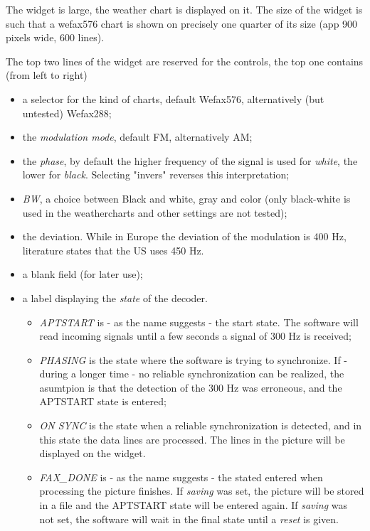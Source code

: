 \documentclass[11pt]{article}
\begin{document}
The widget is large, the weather chart is displayed
on it. The size of the widget is such that a wefax576 chart is shown
on precisely one quarter of its size (app 900 pixels wide, 600 lines).
\par
The top two lines of the widget are reserved for the controls,
the top one contains (from left to right)
\begin{itemize}
\item a selector for the kind of charts, default Wefax576, alternatively
(but untested) Wefax288;
\item the {\em modulation mode}, default FM, alternatively AM;
\item the {\em phase}, by default the higher frequency of the signal
is used for {\em white}, the lower for {\em black}.
Selecting "invers" reverses this interpretation;
\item {\em BW}, a choice between Black and white, gray and color
(only black-white is used in the weathercharts and other settings are not
tested);
\item the {deviation}. While in Europe the deviation of the modulation is
400 Hz, literature states that the US uses 450 Hz.
\item a blank field (for later use);
\item a label displaying the {\em state} of the decoder. 
\begin{itemize}
\item {\em APTSTART} is - as the name suggests - the start state. The software
will read incoming signals until a few seconds a signal of 300 Hz
is received;
\item {\em PHASING} is the state where the software is trying to synchronize.
If - during a longer time - no reliable synchronization can be realized, the
asumtpion is that the detection of the 300 Hz was erroneous, and the APTSTART
state is entered;
\item {\em ON SYNC} is the state when a reliable synchronization is detected,
and in this state the data lines are processed.
The lines in the picture will be displayed on the widget.
\item {\em FAX\_DONE} is - as the name suggests - the stated entered when
processing the picture finishes. If {\em saving} was set, the picture
will be stored in a file and the APTSTART state will be entered again.
If {\em saving} was not set, the software will wait in the final state
until a {\em reset} is given.
\end{itemize}
\end{itemize}
\end{document}
